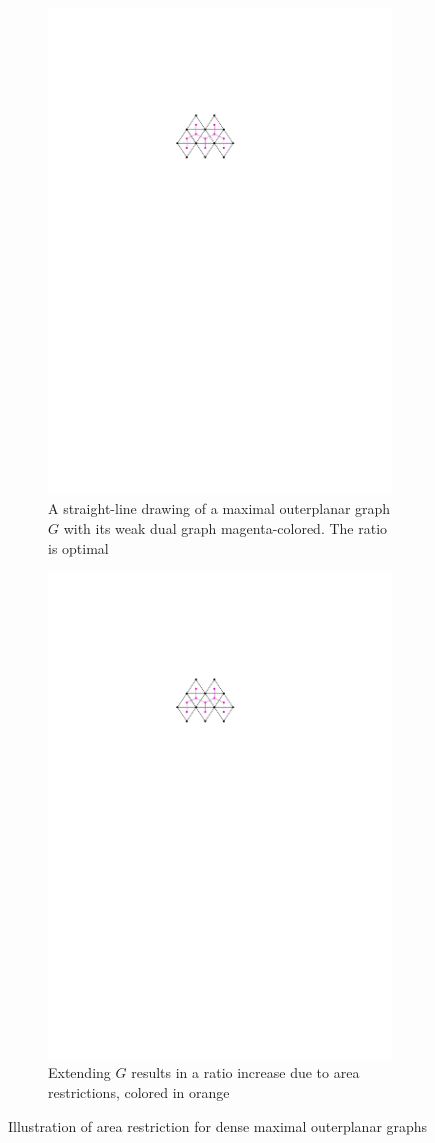 	\begin{figure}[H]
	\centering
	\begin{subfigure}{0.5\textwidth}
		\centering
		\includegraphics[page=1,width=0.7\linewidth]{graphics/maximal_outerplanar_extension_ratio.pdf}
		\caption{A straight-line drawing of a maximal outerplanar graph $G$ with its weak dual graph magenta-colored. The ratio is optimal}
	\end{subfigure}
	\begin{subfigure}{0.5\textwidth}
		\centering
		\includegraphics[page=2,width=0.7\linewidth]{graphics/maximal_outerplanar_extension_ratio.pdf}
		\caption{Extending $G$ results in a ratio increase due to area restrictions, colored in orange}
	\end{subfigure}
	\caption{Illustration of area restriction for dense maximal outerplanar graphs}\label{im:supergraph_ratio_worsened}
\end{figure}
